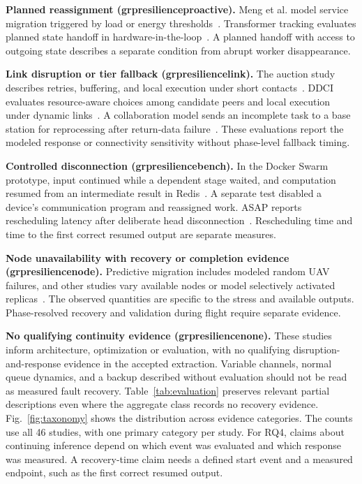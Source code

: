 \documentclass[journal]{IEEEtran}
\newcommand{\groupcite}[2]{\csname grp#1#2\endcsname}
\begin{document}
\textbf{Planned reassignment (\groupcite{resilience}{proactive}).}
Meng et al. model service migration triggered by load or energy thresholds~\cite{R0045}. Transformer tracking evaluates planned state handoff in hardware-in-the-loop~\cite{R0292}. A planned handoff with access to outgoing state describes a separate condition from abrupt worker disappearance.

\textbf{Link disruption or tier fallback (\groupcite{resilience}{link}).}
The auction study describes retries, buffering, and local execution under short contacts~\cite{R0058}. DDCI evaluates resource-aware choices among candidate peers and local execution under dynamic links~\cite{R0092}. A collaboration model sends an incomplete task to a base station for reprocessing after return-data failure~\cite{R0044}. These evaluations report the modeled response or connectivity sensitivity without phase-level fallback timing.

\textbf{Controlled disconnection (\groupcite{resilience}{bench}).}
In the Docker Swarm prototype, input continued while a dependent stage waited, and computation resumed from an intermediate result in Redis~\cite{R0038}. A separate test disabled a device's communication program and reassigned work. ASAP reports rescheduling latency after deliberate head disconnection~\cite{R0062,R0014}. Rescheduling time and time to the first correct resumed output are separate measures.

\textbf{Node unavailability with recovery or completion evidence (\groupcite{resilience}{node}).}
Predictive migration includes modeled random UAV failures, and other studies vary available nodes or model selectively activated replicas~\cite{R0002,R0073,R0106,R0110}. The observed quantities are specific to the stress and available outputs. Phase-resolved recovery and validation during flight require separate evidence.

\textbf{No qualifying continuity evidence (\groupcite{resilience}{none}).}
These studies inform architecture, optimization or evaluation, with no qualifying disruption-and-response evidence in the accepted extraction. Variable channels, normal queue dynamics, and a backup described without evaluation should not be read as measured fault recovery. Table~\ref{tab:evaluation} preserves relevant partial descriptions even where the aggregate class records no recovery evidence. Fig.~\ref{fig:taxonomy} shows the distribution across evidence categories. The counts use all 46 studies, with one primary category per study. For RQ4, claims about continuing inference depend on which event was evaluated and which response was measured. A recovery-time claim needs a defined start event and a measured endpoint, such as the first correct resumed output.

\end{document}
